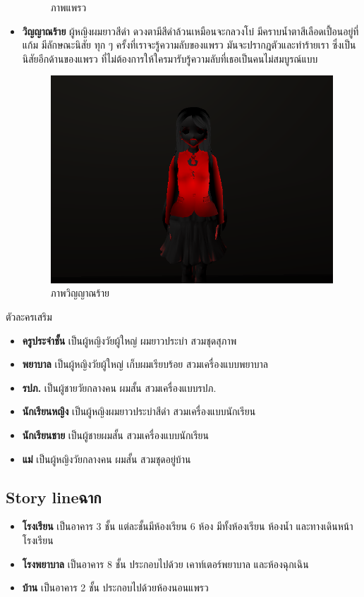 \begin{itemize}
\begin{figure}[h]
              \caption{ภาพแพรว}\label{PrawCharacter}
          \end{figure}
    \item \textbf{วิญญาณร้าย} ผู้หญิงผมยาวสีดำ ดวงตามีสีดำล้วนเหมือนจะกลวงโบ๋ มีคราบน้ำตาสีเลือดเปื้อนอยู่ที่แก้ม มีลักษณะนิสัย ทุก ๆ ครั้งที่เราจะรู้ความลับของแพรว มันจะปรากฎตัวและทำร้ายเรา ซึ่งเป็นนิสัยอีกด้านของแพรว ที่ไม่ต้องการให้ใครมารับรู้ความลับที่เธอเป็นคนไม่สมบูรณ์แบบ
          \begin{figure}[h]
              \centering
              \includegraphics[scale=0.5]{Images/enemylv.1_character.jpg}
              \caption{ภาพวิญญาณร้าย}\label{GhostCharacter}
          \end{figure}
\end{itemize}


\subitem ตัวละครเสริม
\begin{itemize}
    \item \textbf{ครูประจำชั้น} เป็นผู้หญิงวัยผู้ใหญ่  ผมยาวประบ่า สวมชุดสุภาพ
    \item \textbf{พยาบาล} เป็นผู้หญิงวัยผู้ใหญ่ เก็บผมเรียบร้อย สวมเครื่องแบบพยาบาล
    \item \textbf{รปภ.} เป็นผู้ชายวัยกลางคน ผมสั้น สวมเครื่องแบบรปภ.
    \item \textbf{นักเรียนหญิง} เป็นผู้หญิงผมยาวประบ่าสีดำ สวมเครื่องแบบนักเรียน
    \item \textbf{นักเรียนชาย} เป็นผู้ชายผมสั้น  สวมเครื่องแบบนักเรียน
    \item \textbf{แม่} เป็นผู้หญิงวัยกลางคน ผมสั้น สวมชุดอยู่บ้าน
\end{itemize}

\subsection{\ifenglish Story line\else ฉาก\fi }
\begin{itemize}
    \item \textbf{โรงเรียน} เป็นอาคาร 3 ชั้น แต่ละชั้นมีห้องเรียน 6 ห้อง มีทั้งห้องเรียน ห้องน้ำ และทางเดินหน้าโรงเรียน
    \item \textbf{โรงพยาบาล} เป็นอาคาร 8 ชั้น ประกอบไปด้วย เคาท์เตอร์พยาบาล และห้องฉุกเฉิน
    \item \textbf{บ้าน} เป็นอาคาร 2 ชั้น ประกอบไปด้วยห้องนอนแพรว
\end{itemize}

